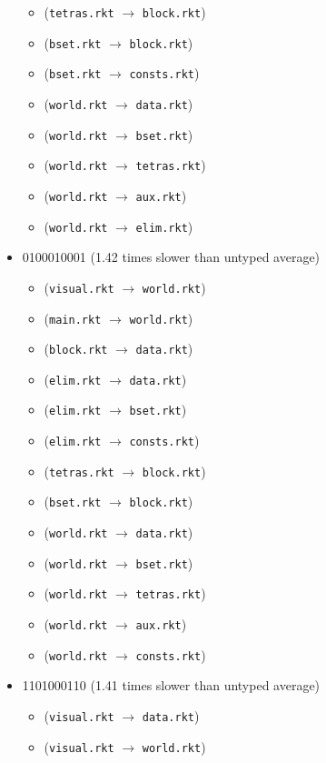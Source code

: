 \documentclass{article}
\newcommand{\mono}[1]{\texttt{#1}}
\begin{document}
\begin{itemize}
\begin{itemize}
  \item (\mono{tetras.rkt} $\rightarrow$ \mono{block.rkt})
  \item (\mono{bset.rkt} $\rightarrow$ \mono{block.rkt})
  \item (\mono{bset.rkt} $\rightarrow$ \mono{consts.rkt})
  \item (\mono{world.rkt} $\rightarrow$ \mono{data.rkt})
  \item (\mono{world.rkt} $\rightarrow$ \mono{bset.rkt})
  \item (\mono{world.rkt} $\rightarrow$ \mono{tetras.rkt})
  \item (\mono{world.rkt} $\rightarrow$ \mono{aux.rkt})
  \item (\mono{world.rkt} $\rightarrow$ \mono{elim.rkt})
  \end{itemize}
\item 0100010001 (1.42 times slower than untyped average)
  \begin{itemize}
  \item (\mono{visual.rkt} $\rightarrow$ \mono{world.rkt})
  \item (\mono{main.rkt} $\rightarrow$ \mono{world.rkt})
  \item (\mono{block.rkt} $\rightarrow$ \mono{data.rkt})
  \item (\mono{elim.rkt} $\rightarrow$ \mono{data.rkt})
  \item (\mono{elim.rkt} $\rightarrow$ \mono{bset.rkt})
  \item (\mono{elim.rkt} $\rightarrow$ \mono{consts.rkt})
  \item (\mono{tetras.rkt} $\rightarrow$ \mono{block.rkt})
  \item (\mono{bset.rkt} $\rightarrow$ \mono{block.rkt})
  \item (\mono{world.rkt} $\rightarrow$ \mono{data.rkt})
  \item (\mono{world.rkt} $\rightarrow$ \mono{bset.rkt})
  \item (\mono{world.rkt} $\rightarrow$ \mono{tetras.rkt})
  \item (\mono{world.rkt} $\rightarrow$ \mono{aux.rkt})
  \item (\mono{world.rkt} $\rightarrow$ \mono{consts.rkt})
  \end{itemize}
\item 1101000110 (1.41 times slower than untyped average)
  \begin{itemize}
  \item (\mono{visual.rkt} $\rightarrow$ \mono{data.rkt})
  \item (\mono{visual.rkt} $\rightarrow$ \mono{world.rkt})

\end{itemize}
\end{itemize}
\end{document}
